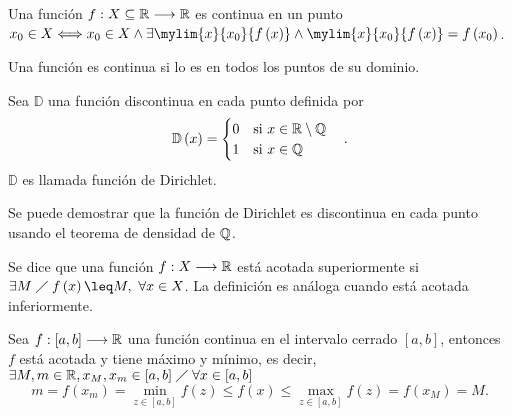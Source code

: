 \begin{defi}
    Una función $f : X\subseteq\mathbb{R}\longrightarrow \mathbb{R}$ es continua en un punto $x_0\in X \iff x_0\in X \land \exists\mylim{x}{x_0}{f\left( x \right)} \land \mylim{x}{x_0}{f\left( x \right) } = f\left( x_0 \right) $.
\end{defi}

\begin{defi}
    Una función es continua si lo es en todos los puntos de su dominio.
\end{defi}

\begin{defi}
    Sea $\mathbb{D}$ una función discontinua en cada punto definida por
    \begin{equation}
        \mathbb{D}\left( x \right) = \begin{cases}
            0\quad\textrm{si } x\in\mathbb{R}\setminus\mathbb{Q} \\
            1\quad\textrm{si } x\in\mathbb{Q}
        \end{cases}.
    \end{equation}
    $\mathbb{D}$ es llamada función de Dirichlet.
\end{defi}

\begin{note}
    Se puede demostrar que la función de Dirichlet es discontinua en cada punto usando el teorema de densidad
    de $\mathbb{Q}$.
\end{note}

\begin{defi}[Acotación]
    Se dice que una función $f : X\longrightarrow \mathbb{R}$ está acotada superiormente si $\exists M\st f\left( x \right) \leq M,\ \forall x\in X$. La definición es análoga cuando está acotada inferiormente.
\end{defi}

\begin{theorem}
    Sea $f : [a, b]\longrightarrow \mathbb{R}$ una función continua en el intervalo cerrado $[a, b]$, entonces $f$ está 
    acotada y tiene máximo y mínimo, es decir, $\exists M, m\in\mathbb{R}, x_M, x_m\in[a, b]\;\diagup\; \forall x\in [a, b]$
    \begin{equation}
        m = f\left( x_m \right) = \underset{z\in[a, b]}{\min} f\left( z \right) \leq f\left( x \right) \leq \underset{z\in[a, b]}{\max} f\left( z \right) = f\left( x_M \right) = M.
    \end{equation}
\end{theorem}

